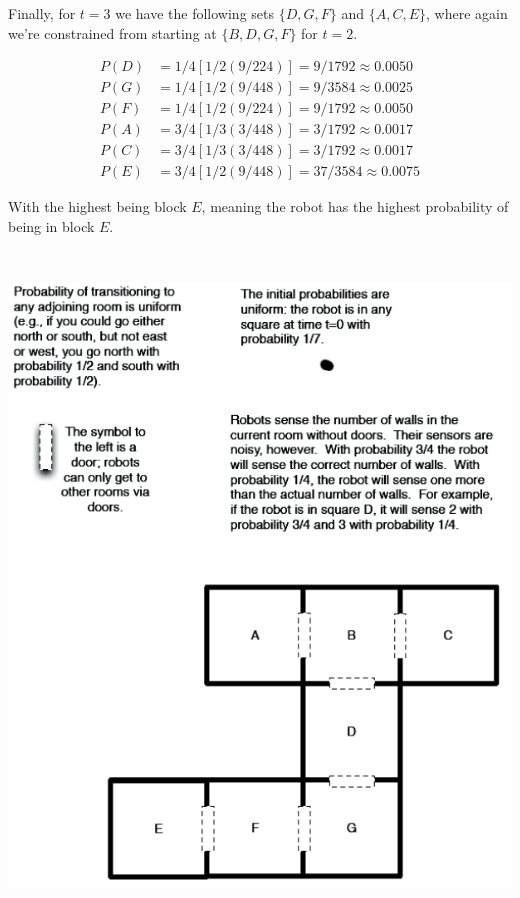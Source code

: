 \documentclass[12pt]{article}
\begin{document}
\begin{description}
Finally, for $t=3$ we have the following sets $\{D,G,F\}$ and $\{A, C, E\}$, where again we're constrained from starting at $\{B,D,G,F\}$ for $t=2$.

\begin{align*}
  P(D) &= 1/4[1/2(9/224)] = 9/1792 \approx 0.0050\\
  P(G) &= 1/4[1/2(9/448)] = 9/3584 \approx 0.0025\\
  P(F) &= 1/4[1/2(9/224)] = 9/1792 \approx 0.0050\\
  P(A) &= 3/4[1/3(3/448)] = 3/1792 \approx 0.0017\\
  P(C) &= 3/4[1/3(3/448)] = 3/1792 \approx 0.0017\\
  P(E) &= 3/4[1/2(9/448)] = 37/3584 \approx 0.0075
\end{align*}

With the highest being block $E$, meaning the robot has the highest probability of being in block $E$.


\end{description}

\clearpage

\begin{center}
\includegraphics[height=7in]{prob2.png}
\end{center}
\end{document}
